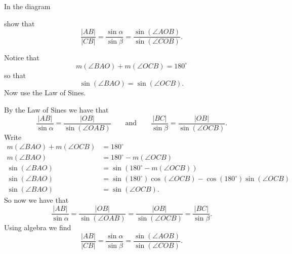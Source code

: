 \documentclass{ximera}
\begin{document}
\begin{problem}\label{46}
In the diagram
\begin{image}
\end{image}
show that
\[
\frac{\left\vert AB\right\vert }{\left\vert CB\right\vert }=\frac
{\sin\alpha}{\sin\beta}=\frac{\sin\left(  \angle
AOB\right)  }{\sin\left(  \angle COB\right)  }.
\]


\begin{hint}
Notice that
\[
m\left(  \angle BAO\right)  +m\left(\angle OCB\right)  =180^{\circ}%
\]
so that%
\[
\sin\left(  \angle BAO\right)  =\sin\left(\angle  OCB\right)  .
\]
Now use the Law of Sines.
\end{hint}
\begin{freeResponse}
By the Law of Sines we have that
\[
\frac{|AB|}{\sin\alpha} = \frac{|OB|}{\sin(\angle OAB)}\qquad\text{and}\qquad\frac{|BC|}{\sin\beta} = \frac{|OB|}{\sin(\angle OCB)}.
\]
Write 
\begin{align*}
m\left(  \angle BAO\right)  +m\left(\angle OCB\right)  &=180^{\circ}\\
m\left(  \angle BAO\right)  &=180^{\circ}-m\left(\angle OCB\right)  \\
\sin\left(\angle BAO\right)  &=\sin\left(180^{\circ}-m\left(\angle OCB\right)\right)  \\
\sin\left(\angle BAO\right)  &=\sin\left(180^{\circ}\right)\cos\left(\angle OCB\right) - \cos\left(180^{\circ}\right)\sin\left(\angle OCB\right)\\ 
\sin\left(\angle BAO\right)  &=\sin\left(\angle OCB\right).
\end{align*}
So  now we have that 
\[
\frac{|AB|}{\sin\alpha} = \frac{|OB|}{\sin(\angle OAB)}= \frac{|OB|}{\sin(\angle OCB)}=\frac{|BC|}{\sin\beta}. 
\]
Using algebra we find 
\[
\frac{\left\vert AB\right\vert }{\left\vert CB\right\vert }=\frac
{\sin\alpha}{\sin\beta}=\frac{\sin\left(  \angle
AOB\right)  }{\sin\left(  \angle COB\right)  }.
\]
\end{freeResponse}
\end{problem}
\end{document}
